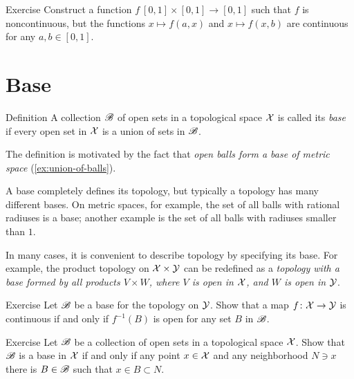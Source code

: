 \begin{thm}{Exercise}\label{ex:cont-product}
Construct a function $f\:[0,1]\times [0,1]\to [0,1]$ such that $f$ is noncontinuous, but the functions 
$x\mapsto f(a,x)$ and $x\mapsto f(x,b)$ are continuous for any $a,b\in [0,1]$.
\end{thm}


\section{Base}

\begin{thm}{Definition}\label{def:base}
A collection $\mathscr{B}$ of open sets in a topological space $\mathcal{X}$ is called its \emph{base} if every open set in $\mathcal{X}$ is a union of sets in $\mathscr{B}$.
\end{thm}

The definition is motivated by the fact that \textit{open balls form a base of metric space} (\ref{ex:union-of-balls}).

A base completely defines its topology,
but typically a topology has many different bases.
On metric spaces, for example, the set of all balls with rational radiuses is a base;
another example is the set of all  balls with radiuses smaller than $1$.

In many cases, it is convenient to describe topology by specifying its base.
For example, the product topology on $\mathcal{X}\times\mathcal{Y}$ can be redefined as a \textit{topology with a base formed by all products $V\times W$, where $V$ is open in $\mathcal{X}$, and $W$ is open in $\mathcal{Y}$}.

\begin{thm}{Exercise}\label{ex:base}
Let $\mathscr{B}$ be a base for the topology on $\mathcal{Y}$.
Show that a map $f\colon \mathcal{X} \to \mathcal{Y}$ is continuous if and only if $f^{-1}(B)$ is open for any set $B$ in $\mathscr{B}$.

\end{thm}



\begin{thm}{Exercise}\label{ex:base-nbhd}
Let $\mathscr{B}$ be a collection of open sets in a topological space $\mathcal{X}$.
Show that $\mathscr{B}$ is a base in $\mathcal{X}$ if and only if any point $x\in \mathcal{X}$ and any neighborhood $N\ni x$ there is $B\in\mathscr{B}$ such that $x\in B\subset N$.
\end{thm}

